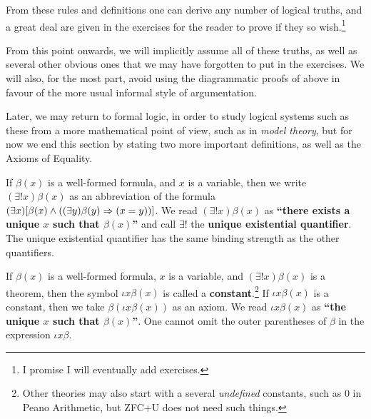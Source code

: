 From these rules and definitions one can derive any number of logical truths, and a great deal are given in the exercises for the reader to prove if they so wish.\footnote{I promise I will eventually add exercises.}

From this point onwards, we will implicitly assume all of these truths, as well as several other obvious ones that we may have forgotten to put in the exercises. We will also, for the most part, avoid using the diagrammatic proofs of above in favour of the more usual informal style of argumentation.

Later, we may return to formal logic, in order to study logical systems such as these from a more mathematical point of view, such as in \emph{model theory}, but for now we end this section by stating two more important definitions, as well as the Axioms of Equality.

\begin{defn}
\label{Defn: There Exists a Unique}

If $\beta(x)$ is a well-formed formula, and $x$ is a variable, then we write $(\exists! x)\beta(x)$ as an abbreviation of the formula $(\exists x)[\beta(x) \land ((\exists y)\beta(y) \Rightarrow (x=y))]$. We read $(\exists! x)\beta(x)$ as \textbf{\enquote{there exists a unique $x$ such that $\beta(x)$}} and call $\exists!$ the \textbf{unique existential quantifier}. The unique existential quantifier has the same binding strength as the other quantifiers.
\end{defn}

\begin{defn}
\label{Defn: Constants}
If $\beta(x)$ is a well-formed formula, $x$ is a variable, and $(\exists! x)\beta(x)$ is a theorem, then the symbol $\iota x \beta(x)$ is called a \textbf{constant}.\footnote{Other theories may also start with a several \emph{undefined} constants, such as 0 in Peano Arithmetic, but ZFC+U does not need such things.} If $\iota x \beta(x)$ is a constant, then we take $\beta(\iota x \beta(x))$ as an axiom. We read $\iota x \beta(x)$ as \textbf{\enquote{the unique $x$ such that $\beta(x)$}}. One cannot omit the outer parentheses of $\beta$ in the expression $\iota x \beta$.
\end{defn}

